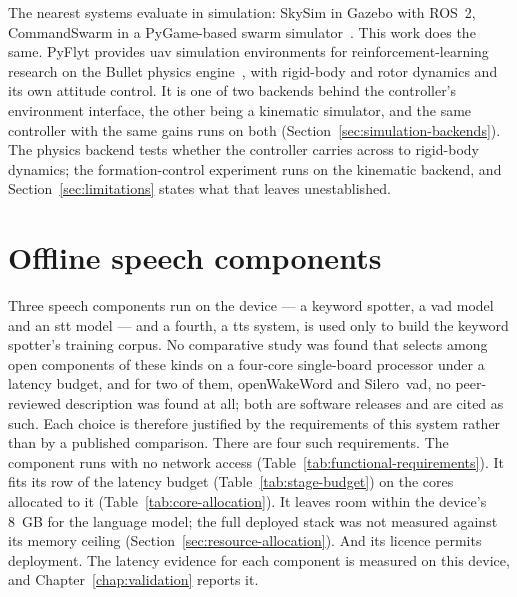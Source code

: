The nearest systems evaluate in simulation: SkySim in Gazebo with ROS~2, CommandSwarm in a
PyGame-based swarm simulator~\cite{skysim2026,commandswarm2026}. This work does the same. PyFlyt
provides \gls{uav} simulation environments for reinforcement-learning research on the Bullet
physics engine~\cite{pyflyt}, with rigid-body and rotor dynamics and its own attitude control. It
is one of two backends behind the controller's environment interface, the other being a kinematic
simulator, and the same controller with the same gains runs on both
(Section~\ref{sec:simulation-backends}). The physics backend tests whether the controller carries
across to rigid-body dynamics; the formation-control experiment runs on the kinematic backend, and
Section~\ref{sec:limitations} states what that leaves unestablished.

\section{Offline speech components}
\label{sec:speech-components}
Three speech components run on the device --- a keyword spotter, a \gls{vad} model and an
\gls{stt} model --- and a fourth, a \gls{tts} system, is used only to build the keyword spotter's
training corpus. No comparative study was found that selects among open components of these kinds
on a four-core single-board processor under a latency budget, and for two of them, openWakeWord and
Silero~\gls{vad}, no peer-reviewed description was found at all; both are software releases and are cited
as such. Each choice is therefore justified by the requirements of this system rather than by a
published comparison. There are four such requirements. The component runs with no network access
(Table~\ref{tab:functional-requirements}). It fits its row of the latency budget
(Table~\ref{tab:stage-budget}) on the cores allocated to it (Table~\ref{tab:core-allocation}). It
leaves room within the device's 8~GB for the language model; the full deployed stack was not
measured against its memory ceiling (Section~\ref{sec:resource-allocation}). And its licence permits
deployment. The latency evidence for each component is measured on this device, and
Chapter~\ref{chap:validation} reports it.

